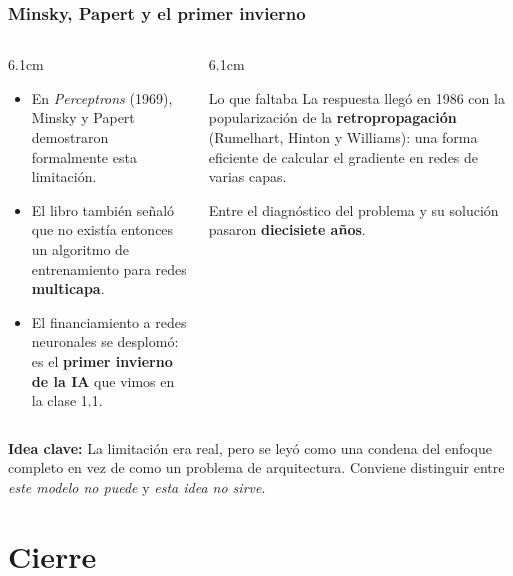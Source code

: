 \documentclass[aspectratio=169, 10pt]{beamer}
\newcommand{\idea}[1]{%
	\begin{tcolorbox}[colback=AccentGreen!6, colframe=AccentGreen, arc=3pt,
		width=\textwidth, boxsep=1pt, left=5pt, right=5pt, top=2pt, bottom=2pt,
		fontupper=\small]
		\RaggedRight\textbf{Idea clave:} #1
	\end{tcolorbox}
}
\begin{document}
\begin{frame}
\frametitle{Minsky, Papert y el primer invierno}
\begin{columns}[T]
\begin{column}{6.1cm}
\begin{itemize}
	\item En \emph{Perceptrons} (1969), Minsky y Papert demostraron formalmente esta limitaci\'on.
	\item El libro tambi\'en se\~nal\'o que no exist\'ia entonces un algoritmo de entrenamiento para redes \textbf{multicapa}.
	\item El financiamiento a redes neuronales se desplom\'o: es el \textbf{primer invierno de la IA} que vimos en la clase 1.1.
\end{itemize}
\end{column}
\begin{column}{6.1cm}
\begin{exampleblock}{Lo que faltaba}
La respuesta lleg\'o en 1986 con la popularizaci\'on de la \textbf{retropropagaci\'on} (Rumelhart, Hinton y Williams): una forma eficiente de calcular el gradiente en redes de varias capas.
\end{exampleblock}
\vspace{0.2em}
\footnotesize
Entre el diagn\'ostico del problema y su soluci\'on pasaron \textbf{diecisiete a\~nos}.
\end{column}
\end{columns}
\vspace{0.4em}
\idea{La limitaci\'on era real, pero se ley\'o como una condena del enfoque completo en vez de como un problema de arquitectura. Conviene distinguir entre \emph{este modelo no puede} y \emph{esta idea no sirve}.}
\end{frame}

\section{Cierre}
\end{document}
